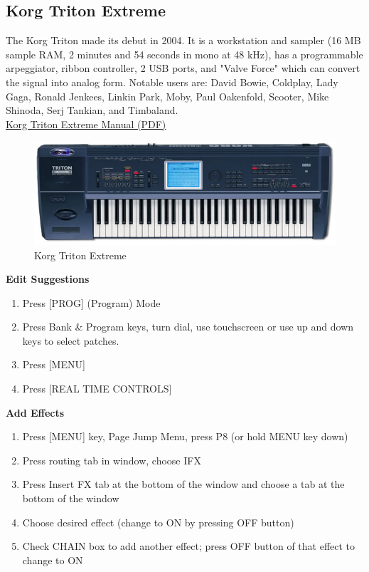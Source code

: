 \subsection{Korg Triton Extreme}
The Korg Triton made its debut in 2004. It is a workstation and sampler (16 MB sample RAM, 2 minutes and 54 seconds in mono at 48 kHz), has a programmable arpeggiator, ribbon controller, 2 USB ports, and "Valve Force" which can convert the signal into analog form. Notable users are: David Bowie, Coldplay, Lady Gaga, Ronald Jenkees, Linkin Park, Moby, Paul Oakenfold, Scooter, Mike Shinoda, Serj Tankian, and Timbaland. \\
\linebreak
\href{https://github.com/dkadyrov/MIDILab/blob/master/Manuals/Korg_Triton_Extreme.pdf}{Korg Triton Extreme Manual (PDF)}

\begin{figure}[h]
\centering
\includegraphics[width=.85\textwidth]{Images/tritonextreme.jpg}
\caption{Korg Triton Extreme}
\label{fig:fullfig}
\end{figure}

\textbf{Edit Suggestions}
\begin{enumerate}
	\item Press [PROG] (Program) Mode
	\item Press Bank \& Program keys, turn dial, use touchscreen or use up and down keys to select patches.
	\item Press [MENU]
	\item Press [REAL TIME CONTROLS]
\end{enumerate}

\textbf{Add Effects}
\begin{enumerate}
	\item Press [MENU] key, Page Jump Menu, press P8 (or hold MENU key down)
	\item Press routing tab in window, choose IFX
	\item Press Insert FX tab at the bottom of the window and choose a tab at the bottom of the window
	\item Choose desired effect (change to ON by pressing OFF button)
	\item Check CHAIN box to add another effect; press OFF button of that effect to change to ON
\end{enumerate}

